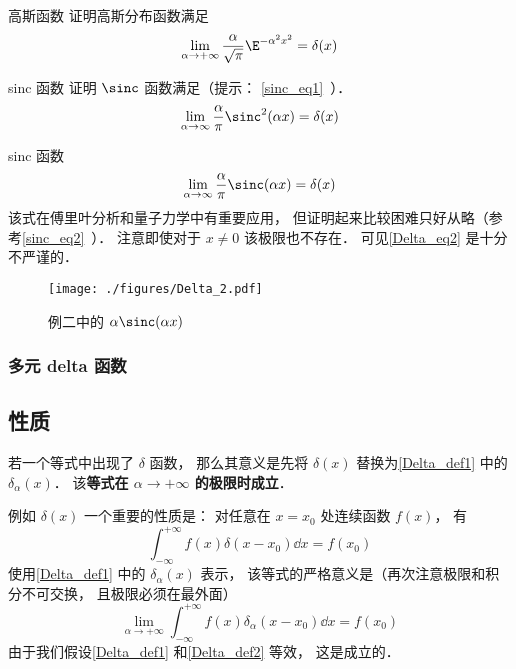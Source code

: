 \begin{exercise}{高斯函数}
证明高斯分布函数满足
\begin{equation}
\lim_{\alpha\to+\infty}\frac{\alpha}{\sqrt{\pi}} \E^{-{\alpha ^2}x^2} = \delta(x)
\end{equation}
\end{exercise}
\begin{exercise}{sinc 函数}\label{Delta_exe1}
证明 $\sinc$ 函数满足（提示： \autoref{sinc_eq1}~）．
\begin{equation}
\lim_{\alpha\to\infty}\frac{\alpha}{\pi}\sinc^2(\alpha x) = \delta(x)
\end{equation}
\end{exercise}

\begin{example}{sinc 函数}\label{Delta_ex2}
\begin{equation}\label{Delta_eq10}
\lim_{\alpha\to\infty}\frac{\alpha}{\pi}\sinc(\alpha x) = \delta(x)
\end{equation}
该式在傅里叶分析和量子力学中有重要应用， 但证明起来比较困难只好从略（参考\autoref{sinc_eq2}~）． 注意即使对于 $x \ne 0$ 该极限也不存在． 可见\autoref{Delta_eq2} 是十分不严谨的．
\end{example}
\begin{figure}[ht]
\centering
\texttt{[image: ./figures/Delta\_2.pdf]}
\caption{例二中的 $\alpha\sinc(\alpha x)$} \label{Delta_fig2}
\end{figure}

\subsubsection{多元 delta 函数}

\subsection{性质}
若一个等式中出现了 $\delta$ 函数， 那么其意义是先将 $\delta(x)$ 替换为\autoref{Delta_def1} 中的 $\delta_\alpha(x)$． 该\textbf{等式在 $\alpha\to+\infty$ 的极限时成立}．

例如 $\delta(x)$ 一个重要的性质是： 对任意在 $x = x_0$ 处连续函数 $f(x)$， 有
\begin{equation}\label{Delta_eq7}
\int_{-\infty}^{+\infty} f(x) \delta(x - x_0) \dd{x}= f(x_0)
\end{equation}
使用\autoref{Delta_def1} 中的 $\delta_\alpha(x)$ 表示， 该等式的严格意义是（再次注意极限和积分不可交换， 且极限必须在最外面）
\begin{equation}\label{Delta_eq11}
\lim_{\alpha\to+\infty}\int_{-\infty}^{+\infty} f(x) \delta_\alpha(x - x_0) \dd{x}= f(x_0)
\end{equation}
由于我们假设\autoref{Delta_def1} 和\autoref{Delta_def2} 等效， 这是成立的．

